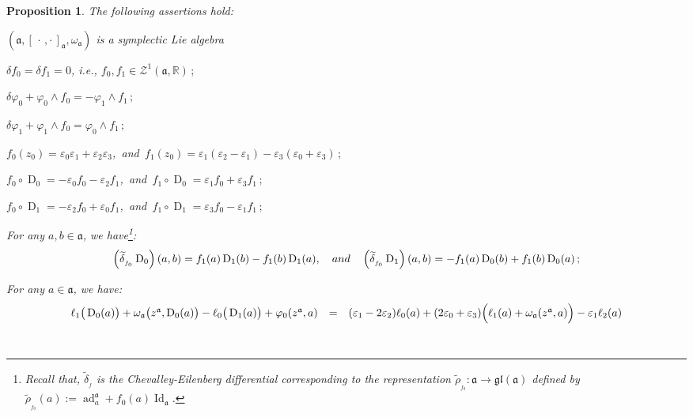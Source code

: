 \documentclass[10pt,a4paper]{amsart}
\newtheorem{proposition}{Proposition}
\newcommand{\D}{\operatorname{D}}
\newcommand{\ad}{\operatorname{ad}}
\newcommand{\ai}{\mathfrak{a}}
\newcommand{\et}{\quad \textnormal{and}\quad}
\newcommand{\gl}{\mathfrak{gl}}
\newcommand{\id}{\operatorname{Id}}
\newcommand{\rel}{\mathbb{R}}
\newcommand{\ro}{\circ}
\newcommand{\w}{\omega}
\begin{document}
\begin{proposition}\label{propCondDoublExtDim2}
	The following assertions hold:\vspace{1mm}
	\item[$1.$] $(\ai,[\,\cdot\,,\cdot\,]_\ai,\w_\ai)$ is a symplectic Lie algebra$\;$\vspace{1mm}
	\item[$2.$] $\delta f_0=\delta f_1=0$, i.e., $f_0,f_1\in\mathcal{Z}^1(\ai,\rel)\,;$\vspace{1mm} 
	\item[$3.$] $\delta\varphi_0+\varphi_0\wedge f_0=-\varphi_1\wedge f_1\,;$\vspace{1mm}
	\item[$4.$] $\delta\varphi_1+\varphi_1\wedge f_0=\varphi_0\wedge f_1\,;$\vspace{1mm}
	\item[$5.$] $f_0(z_0)=\varepsilon_0\varepsilon_1+\varepsilon_2\varepsilon_3$,\, and $\,f_1(z_0)=\varepsilon_1(\varepsilon_2-\varepsilon_1)-\varepsilon_3(\varepsilon_0+\varepsilon_3)\,;$\vspace{1mm}
	\item[$6.$] $f_0\ro\D_0=-\varepsilon_0f_0-\varepsilon_2f_1$,\, and $\,f_1\ro\D_0=\varepsilon_1f_0+\varepsilon_3f_1\,;$\vspace{1mm}
	\item[$7.$] $f_0\ro\D_1=-\varepsilon_2f_0+\varepsilon_0f_1$,\, and $\,f_1\ro\D_1=\varepsilon_3f_0-\varepsilon_1f_1\,;$\vspace{1mm}
	\item[$8.$] For any $a,b\in\ai$, we have\footnote{Recall that, $\widetilde{\delta}_{_f}$ is the Chevalley-Eilenberg differential corresponding to the representation $\widetilde{\rho}_{_{f_0}}:\ai\to\gl(\ai)$ defined by $\widetilde{\rho}_{_{f_0}}(a):=\ad^\ai_a+f_0(a)\id_\ai$.}:
	\begin{equation*}
\left(\widetilde{\delta}_{_{f_0}}\D_0\right)(a,b)=f_1(a)\D_1(b)-f_1(b)\D_1(a),\et
\left(\widetilde{\delta}_{_{f_0}}\D_1\right)(a,b)=-f_1(a)\D_0(b)+f_1(b)\D_0(a)\,;
	\end{equation*}
	\item[$9.$] For any $a\in\ai$, we have:
	\begin{equation*}
	\begin{array}{r c l}\vspace{0.75mm}
	\ell_1\big(\D_0(a)\big)+\w_\ai\big(z^\ai,\D_0(a)\big)-\ell_0\big(\D_1(a)\big)+\varphi_0(z^\ai,a)&=&(\varepsilon_1-2\varepsilon_2)\ell_0(a)+(2\varepsilon_0+\varepsilon_3)\Big(\ell_1(a)+\w_\ai(z^\ai,a)\Big)-\varepsilon_1\ell_2(a)\\\vspace{2.5mm}

\end{array}
\end{equation*}
\end{proposition}
\end{document}
